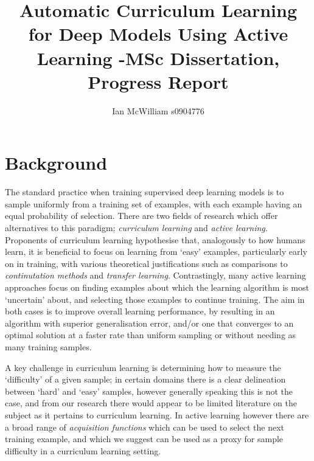\documentclass[a4paper,10pt]{article}
\begin{document}
\title{Automatic Curriculum Learning for Deep Models Using Active Learning -MSc Dissertation, Progress Report}
\author{Ian McWilliam s0904776} 
\date{}
\maketitle

\section{Background}
The standard practice when training supervised deep learning models is to sample uniformly from a training set of examples, with each example having an equal probability of selection. There are two fields of research which offer alternatives to this paradigm; \textit{curriculum learning} and \textit{active learning}. Proponents of curriculum learning hypothesise that, analogously to how humans learn, it is beneficial to focus on learning from `easy' examples, particularly early on in training, with various theoretical justifications such as comparisons to \textit{continutation methods} and \textit{transfer learning}. Contrastingly, many active learning approaches focus on finding examples about which the learning algorithm is most `uncertain' about, and selecting those examples to continue training. The aim in both cases is to improve overall learning performance, by resulting in an algorithm with superior generalisation error, and/or one that converges to an optimal solution at a faster rate than uniform sampling or without needing as many training samples. 

A key challenge in curriculum learning is determining how to measure the `difficulty' of a given sample; in certain domains there is a clear delineation between `hard' and `easy' samples, however generally speaking this is not the case, and from our research there would appear to be limited literature on the subject as it pertains to curriculum learning. In active learning however there are a broad range of \textit{acquisition functions} which can be used to select the next training example, and which we suggest can be used as a proxy for sample difficulty in a curriculum learning setting. 
\end{document}
